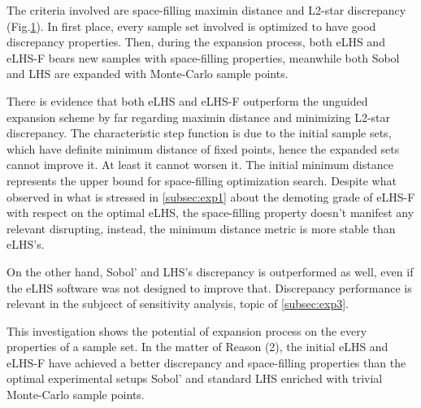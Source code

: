 \documentclass[12pt]{extarticle}
\newcommand{\mfigref}[1]{Fig.\ref{#1}}
\newcommand{\midcaption}[1]{
    \captionsetup{justification=centering}
    \caption{#1}
}
\begin{document}
The criteria involved are space-filling maximin distance and L2-star discrepancy (\mfigref{fig:exp2}). In first place, every sample set involved is optimized to have good discrepancy properties. Then, during the expansion process, both eLHS and eLHS-F bears new samples with space-filling properties, meanwhile both Sobol and LHS are expanded with Monte-Carlo sample points.

\begin{figure}[H]
    \centering
    \begin{subfigure}[b]{0.6\textwidth}
        \centering
    \end{subfigure}
    \begin{subfigure}[b]{0.6\textwidth}
        \centering
    \end{subfigure}
    \captionsetup{skip=0pt}
    \midcaption{}
    \label{fig:exp2}
\end{figure}

There is evidence that both eLHS and eLHS-F outperform the unguided expansion scheme by far regarding maximin distance and minimizing L2-star discrepancy. The characteristic step function is due to the initial sample sets, which have definite minimum distance of fixed points, hence the expanded sets cannot improve it. At least it cannot worsen it. The initial minimum distance represents the upper bound for space-filling optimization search. Despite what observed in what is stressed in \cref{subsec:exp1} about the demoting grade of eLHS-F with respect on the optimal eLHS, the space-filling property doesn't manifest any relevant disrupting, instead, the minimum distance metric is more stable than eLHS's. 

On the other hand, Sobol' and LHS's discrepancy is outperformed as well, even if the eLHS software was not designed to improve that. Discrepancy performance is relevant in the subjcect of sensitivity analysis, topic of \cref{subsec:exp3}.

This investigation shows the potential of expansion process on the every properties of a sample set. In the matter of Reason (2), the initial eLHS and eLHS-F have achieved a better discrepancy and space-filling properties than the optimal experimental setups Sobol' and standard LHS enriched with trivial Monte-Carlo sample points.
\end{document}
